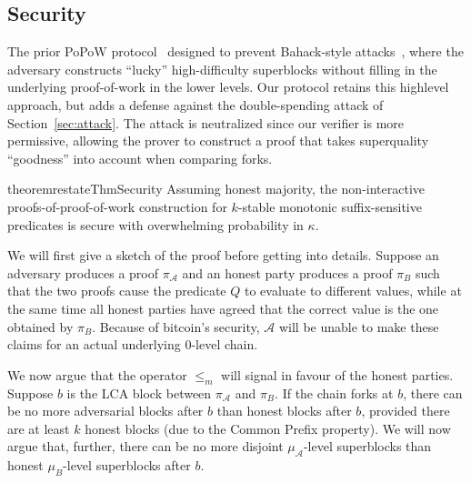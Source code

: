 \subsection{Security}

The prior PoPoW protocol~\cite{KLS} designed to prevent Bahack-style
attacks~\cite{bahack}, where the adversary constructs ``lucky'' high-difficulty
superblocks without filling in the underlying proof-of-work in the lower
levels.
Our protocol retains this highlevel approach, but adds a defense against the double-spending attack of Section~\ref{sec:attack}.
The attack is neutralized since our
verifier is more permissive, allowing the prover to construct a proof that takes superquality  ``goodness'' into account when comparing forks.


\begin{restatable}{theorem}{restateThmSecurity}
    \label{thm.security}
    Assuming honest majority, the non-interactive proofs-of-proof-of-work
    construction for $k$-stable monotonic suffix-sensitive predicates is secure
    with overwhelming probability in $\kappa$.
\end{restatable}

We will first give a sketch of the proof before getting into 
details. Suppose an adversary produces a proof $\pi_\mathcal{A}$ and an honest
party produces a proof $\pi_B$ such that the two proofs cause the predicate $Q$
to evaluate to different values, while at the same time all honest parties have
agreed that the correct value is the one obtained by $\pi_B$. Because of
bitcoin's security, $\mathcal{A}$ will be unable to make these claims for an
actual underlying 0-level chain.

We now argue that the operator $\leq_m$ will
signal in favour of the honest parties.
Suppose $b$ is the LCA block between $\pi_\mathcal{A}$ and $\pi_B$. If the chain
forks at $b$, there can be no more adversarial blocks after $b$ than honest
blocks after $b$, provided there are at least $k$ honest blocks (due to the
Common Prefix property). We will now argue that, further, there can be no more
disjoint $\mu_\mathcal{A}$-level superblocks than honest $\mu_B$-level
superblocks after $b$.

